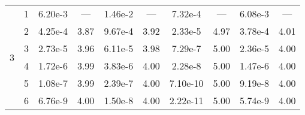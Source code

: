 \begin{table}
{\begin{tabular}{l c c c c c c c c c}
\midrule
\multirow{6}{*}{3}
 & 1 & 6.20e-3 & --- & 1.46e-2 & --- & 7.32e-4 & --- & 6.08e-3 & --- \\ 
 & 2 & 4.25e-4 & 3.87 & 9.67e-4 & 3.92 & 2.33e-5 & 4.97 & 3.78e-4 & 4.01 \\ 
 & 3 & 2.73e-5 & 3.96 & 6.11e-5 & 3.98 & 7.29e-7 & 5.00 & 2.36e-5 & 4.00 \\ 
 & 4 & 1.72e-6 & 3.99 & 3.83e-6 & 4.00 & 2.28e-8 & 5.00 & 1.47e-6 & 4.00 \\ 
 & 5 & 1.08e-7 & 3.99 & 2.39e-7 & 4.00 & 7.10e-10 & 5.00 & 9.19e-8 & 4.00 \\ 
 & 6 & 6.76e-9 & 4.00 & 1.50e-8 & 4.00 & 2.22e-11 & 5.00 & 5.74e-9 & 4.00 \\ 

        \bottomrule
    \end{tabular}}
\end{table}
